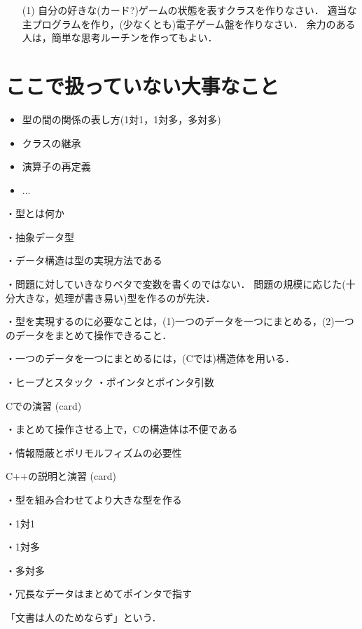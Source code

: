 \begin{enumerate}

 \item[(1)] 自分の好きな(カード?)ゲームの状態を表すクラスを作りなさい．
適当な主プログラムを作り，(少なくとも)電子ゲーム盤を作りなさい．
余力のある人は，簡単な思考ルーチンを作ってもよい．

\end{enumerate}

\section{ここで扱っていない大事なこと}

\begin{itemize}

 \item 型の間の関係の表し方(1対1，1対多，多対多)

 \item クラスの継承

 \item 演算子の再定義

 \item ...

\end{itemize}




・型とは何か

・抽象データ型

・データ構造は型の実現方法である

・問題に対していきなりベタで変数を書くのではない．
問題の規模に応じた(十分大きな，処理が書き易い)型を作るのが先決．

・型を実現するのに必要なことは，(1)一つのデータを一つにまとめる，(2)一つのデータをまとめて操作できること．

・一つのデータを一つにまとめるには，(Cでは)構造体を用いる．

・ヒープとスタック
・ポインタとポインタ引数

Cでの演習 (card)

・まとめて操作させる上で，Cの構造体は不便である

・情報隠蔽とポリモルフィズムの必要性

C++の説明と演習 (card)

・型を組み合わせてより大きな型を作る

・1対1

・1対多

・多対多

・冗長なデータはまとめてポインタで指す



「文書は人のためならず」という．

